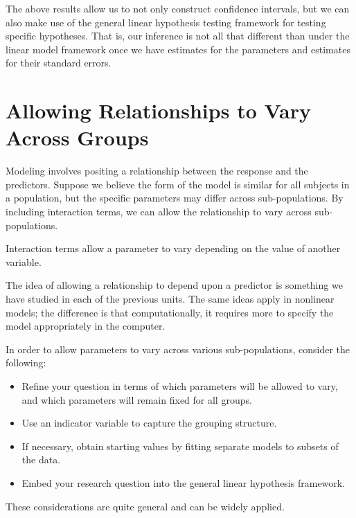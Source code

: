 \documentclass[
]{book}
\providecommand{\tightlist}{%
  \setlength{\itemsep}{0pt}\setlength{\parskip}{0pt}}
\theoremstyle{plain}
\theoremstyle{mydefn}
\theoremstyle{myexmpl}
\theoremstyle{remark}
\begin{document}
The above results allow us to not only construct confidence intervals, but we can also make use of the general linear hypothesis testing framework for testing specific hypotheses. That is, our inference is not all that different than under the linear model framework once we have estimates for the parameters and estimates for their standard errors.

\hypertarget{allowing-relationships-to-vary-across-groups}{%
\section{Allowing Relationships to Vary Across Groups}\label{allowing-relationships-to-vary-across-groups}}

Modeling involves positing a relationship between the response and the predictors. Suppose we believe the form of the model is similar for all subjects in a population, but the specific parameters may differ across sub-populations. By including interaction terms, we can allow the relationship to vary across sub-populations.

\begin{rmdkeyidea}
Interaction terms allow a parameter to vary depending on the value of another variable.
\end{rmdkeyidea}

The idea of allowing a relationship to depend upon a predictor is something we have studied in each of the previous units. The same ideas apply in nonlinear models; the difference is that computationally, it requires more to specify the model appropriately in the computer.

\begin{rmdtip}
In order to allow parameters to vary across various sub-populations, consider the following:

\begin{itemize}
\tightlist
\item
  Refine your question in terms of which parameters will be allowed to vary, and which parameters will remain fixed for all groups.
\item
  Use an indicator variable to capture the grouping structure.
\item
  If necessary, obtain starting values by fitting separate models to subsets of the data.
\item
  Embed your research question into the general linear hypothesis framework.
\end{itemize}

These considerations are quite general and can be widely applied.
\end{rmdtip}
\end{document}
